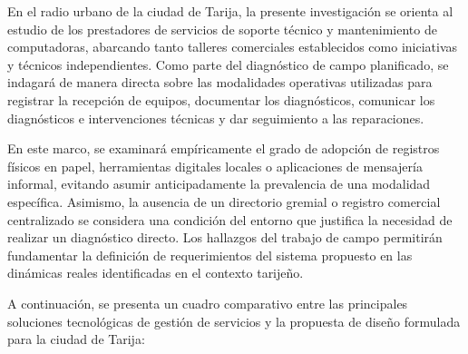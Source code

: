 En el radio urbano de la ciudad de Tarija, la presente investigación se orienta al estudio de los prestadores de servicios de soporte técnico y mantenimiento de computadoras, abarcando tanto talleres comerciales establecidos como iniciativas y técnicos independientes. Como parte del diagnóstico de campo planificado, se indagará de manera directa sobre las modalidades operativas utilizadas para registrar la recepción de equipos, documentar los diagnósticos, comunicar los diagnósticos e intervenciones técnicas y dar seguimiento a las reparaciones.

En este marco, se examinará empíricamente el grado de adopción de registros físicos en papel, herramientas digitales locales o aplicaciones de mensajería informal, evitando asumir anticipadamente la prevalencia de una modalidad específica. Asimismo, la ausencia de un directorio gremial o registro comercial centralizado se considera una condición del entorno que justifica la necesidad de realizar un diagnóstico directo. Los hallazgos del trabajo de campo permitirán fundamentar la definición de requerimientos del sistema propuesto en las dinámicas reales identificadas en el contexto tarijeño.

A continuación, se presenta un cuadro comparativo entre las principales soluciones tecnológicas de gestión de servicios y la propuesta de diseño formulada para la ciudad de Tarija:

